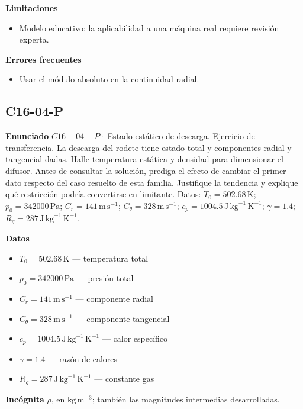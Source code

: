 \documentclass[10pt,openany]{book}
\begin{document}
\noindent\textbf{Limitaciones}
\begin{itemize}
\item Modelo educativo; la aplicabilidad a una máquina real requiere revisión experta.
\end{itemize}

\noindent\textbf{Errores frecuentes}
\begin{itemize}
\item Usar el módulo absoluto en la continuidad radial.
\end{itemize}
\subsection*{C16-04-P}

\noindent\textbf{Enunciado}
\(C16-04-P \cdot\) Estado estático de descarga. Ejercicio de transferencia. La descarga del rodete tiene estado total y componentes radial y tangencial dadas. Halle temperatura estática y densidad para dimensionar el difusor. Antes de consultar la solución, prediga el efecto de cambiar el primer dato respecto del caso resuelto de esta familia. Justifique la tendencia y explique qué restricción podría convertirse en limitante. Datos: \(T_0=502.68\, \mathrm{K}\); \(p_0=342000\, \mathrm{Pa}\); \(C_r=141\, \mathrm{m}\,\mathrm{s}^{-1}\); \(C_\theta=328\, \mathrm{m}\,\mathrm{s}^{-1}\); \(c_p=1004.5\, \mathrm{J}\,\mathrm{kg}^{-1}\,\mathrm{K}^{-1}\); \(\gamma=1.4\); \(R_g=287\, \mathrm{J}\,\mathrm{kg}^{-1}\,\mathrm{K}^{-1}\).

\noindent\textbf{Datos}
\begin{itemize}
\item $T_0 = 502.68\,\mathrm{K}$ — temperatura total
\item $p_0 = 342000\,\mathrm{Pa}$ — presión total
\item $C_r = 141\,\mathrm{m}\,\mathrm{s}^{-1}$ — componente radial
\item $C_\theta = 328\,\mathrm{m}\,\mathrm{s}^{-1}$ — componente tangencial
\item $c_p = 1004.5\,\mathrm{J}\,\mathrm{kg}^{-1}\,\mathrm{K}^{-1}$ — calor específico
\item $\gamma = 1.4$ — razón de calores
\item $R_g = 287\,\mathrm{J}\,\mathrm{kg}^{-1}\,\mathrm{K}^{-1}$ — constante gas
\end{itemize}

\noindent\textbf{Incógnita}
$\rho$, en $\mathrm{kg\,m^{-3}}$; también las magnitudes intermedias desarrolladas.
\end{document}
